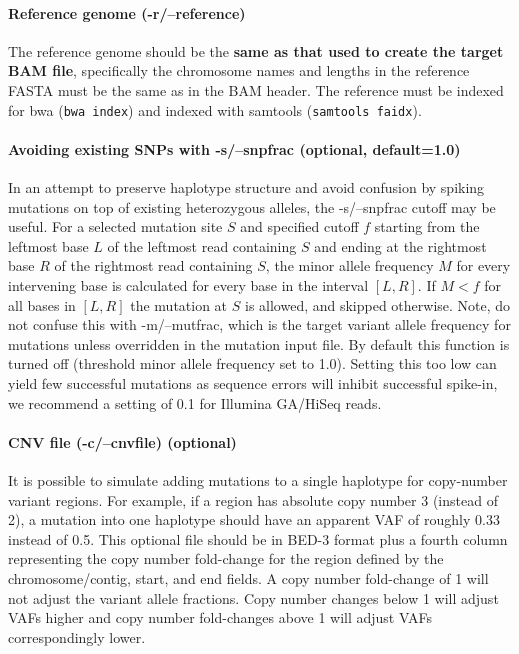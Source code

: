 \documentclass[letterpaper,11pt]{article}
\begin{document}
\paragraph{Reference genome (-r/--reference)}
	The reference genome should be the \textbf{same as that used to create the target BAM file}, specifically the chromosome names and lengths in the reference FASTA must be the same as in the BAM header. The reference must be indexed for bwa (\texttt{bwa index}) and indexed with samtools (\texttt{samtools faidx}).
	
\paragraph{Avoiding existing SNPs with -s/--snpfrac (optional, default=1.0)}
	In an attempt to preserve haplotype structure and avoid confusion by spiking mutations on top of existing heterozygous alleles, the -s/--snpfrac cutoff may be useful. For a selected mutation site $S$ and specified cutoff $f$ starting from the leftmost base $L$ of the leftmost read containing $S$ and ending at the rightmost base $R$ of the rightmost read containing $S$, the minor allele frequency $M$ for every intervening base is calculated for every base in the interval $[L,R]$. If $M < f$ for all bases in $[L,R]$ the mutation at $S$ is allowed, and skipped otherwise. Note, do not confuse this with -m/--mutfrac, which is the target variant allele frequency for mutations unless overridden in the mutation input file. By default this function is turned off (threshold minor allele frequency set to 1.0). Setting this too low can yield few successful mutations as sequence errors will inhibit successful spike-in, we recommend a setting of 0.1 for Illumina GA/HiSeq reads.

\paragraph{CNV file (-c/--cnvfile) (optional)}
	It is possible to simulate adding mutations to a single haplotype for copy-number variant regions. For example, if a region has absolute copy number 3 (instead of 2), a mutation into one haplotype should have an apparent VAF of roughly 0.33 instead of 0.5. This optional file should be in BED-3 format plus a fourth column representing the copy number fold-change for the region defined by the chromosome/contig, start, and end fields. A copy number fold-change of 1 will not adjust the variant allele fractions. Copy number changes below 1 will adjust VAFs higher and copy number fold-changes above 1 will adjust VAFs correspondingly lower.
\end{document}

